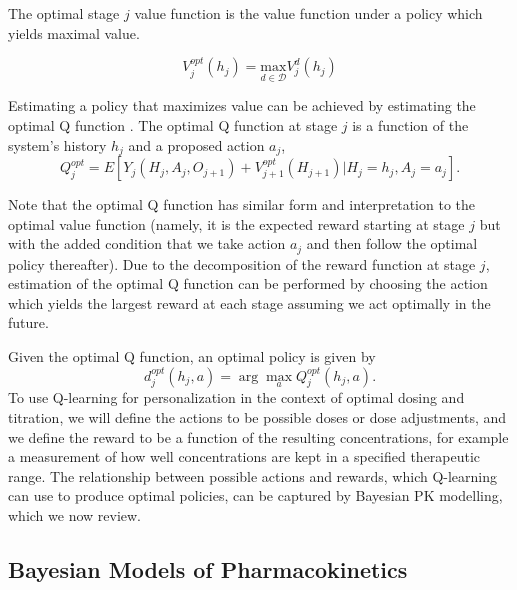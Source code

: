 \noindent The optimal stage $ j  $ value function is the value function under a policy which yields maximal value. 

\begin{equation}
V^{opt}_j(h_j) = \underset{d \in \mathscr{D}}{\mbox{max}} V^d_j(h_j)
\end{equation}

\noindent  Estimating a policy that maximizes value can be achieved by estimating the optimal Q function \cite{chakraborty2013statistical}.  The optimal Q function at stage $ j $ is a function of the system’s history $ h_j $ and a proposed action $ a_j $,
\begin{equation}
 Q_j^{opt} = E \left[ 
 Y_j(H_j, A_j, O_{j+1}) + V^{opt}_{j+1}(H_{j+1}) \lvert H_j = h_j, A_j = a_j
 \right].
\end{equation}

Note that the optimal Q function has similar form and interpretation to the optimal value function (namely, it is the expected reward starting at stage $ j $ but with the added condition that we take action $ a_j $ and then follow the optimal policy thereafter). Due to the decomposition of the reward function at stage $ j $, estimation of the optimal Q function can be performed by choosing the action which yields the largest reward at each stage assuming we act optimally in the future. 

Given the optimal Q function, an optimal policy is given by 
\begin{equation}
d_j^{opt}(h_j,a) = \arg\max_{a} Q_j^{opt}(h_j,a).
\end{equation}
To use Q-learning for personalization in the context of optimal dosing and titration, we will define the actions to be possible doses or dose adjustments, and we define the reward to be a function of the resulting concentrations, for example a measurement of how well concentrations are kept in a specified therapeutic range. The relationship between possible actions and rewards, which Q-learning can use to produce optimal policies, can be captured by Bayesian PK modelling, which we now review.

\subsection{Bayesian Models of Pharmacokinetics}

